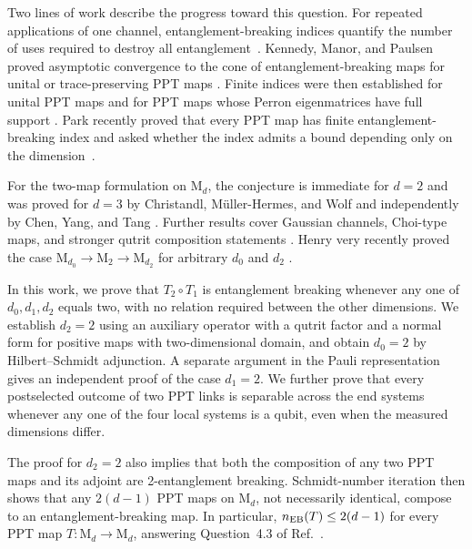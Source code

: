 \documentclass[aps,prl,reprint,superscriptaddress,nofootinbib]{revtex4-2}
\newcommand{\M}{\mathrm{M}}
\begin{document}
Two lines of work describe the progress toward this question.  For repeated
applications of one channel, entanglement-breaking indices quantify the
number of uses required to destroy all entanglement~\cite{Lami2015}.
Kennedy, Manor, and Paulsen proved asymptotic convergence to the
cone of entanglement-breaking maps for unital or trace-preserving PPT maps
\cite{Kennedy2018}.  Finite indices were then established for unital PPT maps
and for PPT maps whose Perron eigenmatrices have full support
\cite{Rahaman2018,Hanson2020}.  Park recently proved that every PPT map has
finite entanglement-breaking index and asked whether the index admits a bound
depending only on the dimension~\cite{Park2026}.

For the two-map formulation on $\M_d$, the conjecture is immediate for $d=2$
and was proved for $d=3$ by Christandl,
M\"uller-Hermes, and Wolf and independently by Chen, Yang, and Tang
\cite{Horodecki1996,Christandl2019,Chen2019}.  Further results cover Gaussian
channels, Choi-type maps, and stronger qutrit composition statements
\cite{Christandl2019,Singh2022,An2026}.  Henry very recently proved the case
$\M_{d_0}\to\M_2\to\M_{d_2}$ for arbitrary $d_0$ and $d_2$
\cite{Henry2026}.

In this work, we prove that $T_2\circ T_1$ is entanglement breaking whenever
any one of $d_0,d_1,d_2$ equals two, with no relation required between the
other dimensions.  We establish $d_2=2$ using an auxiliary operator with a
qutrit factor and a normal form for positive maps with two-dimensional
domain, and obtain $d_0=2$ by Hilbert--Schmidt adjunction.  A separate
argument in the Pauli representation gives an independent proof of the case
$d_1=2$.  We further prove that every postselected outcome of two PPT links is
separable across the end systems whenever any one of the four local systems
is a qubit, even when the measured dimensions differ.

The proof for $d_2=2$ also implies that both the composition of any two PPT
maps and its adjoint are 2-entanglement breaking.  Schmidt-number iteration
then shows that any $2(d-1)$ PPT maps on $\M_d$, not necessarily identical,
compose to an entanglement-breaking map.  In particular,
$n_{\rm EB}(T)\leq2(d-1)$ for every PPT map $T:\M_d\to\M_d$, answering
Question~4.3 of Ref.~\cite{Park2026}.
\end{document}
